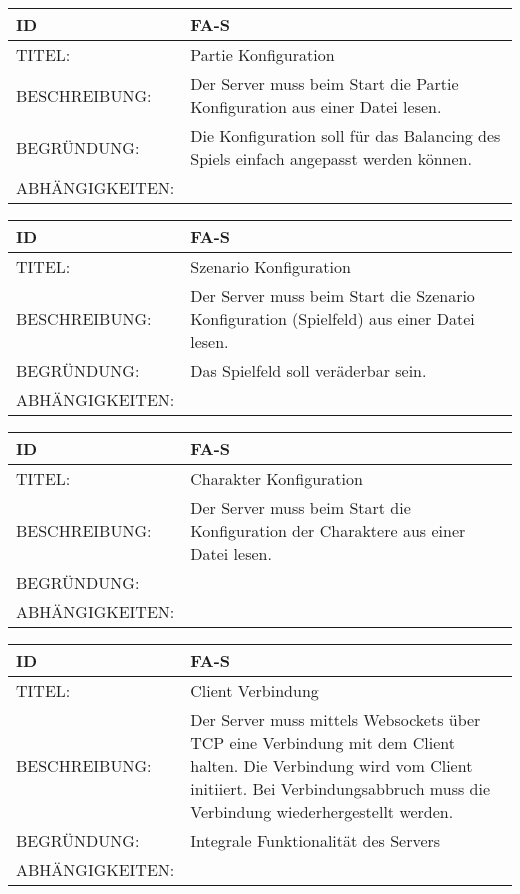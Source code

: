 \begin{tabularx}{16cm}{l|X}
\textbf{ID} & \textbf{FA-S} \\
\hline
TITEL: & Partie Konfiguration \\
\hline
BESCHREIBUNG: & Der Server muss beim Start die Partie Konfiguration aus einer Datei lesen. \\
\hline
BEGRÜNDUNG: & Die Konfiguration soll für das Balancing des Spiels einfach angepasst werden können. \\
\hline
ABHÄNGIGKEITEN: & \\
\end{tabularx}

\begin{tabularx}{16cm}{l|X}
\textbf{ID} & \textbf{FA-S} \\
\hline
TITEL: & Szenario Konfiguration \\
\hline
BESCHREIBUNG: & Der Server muss beim Start die Szenario Konfiguration (Spielfeld) aus einer Datei lesen. \\
\hline
BEGRÜNDUNG: & Das Spielfeld soll veräderbar sein. \\
\hline
ABHÄNGIGKEITEN: & \\
\end{tabularx}

\begin{tabularx}{16cm}{l|X}
\textbf{ID} & \textbf{FA-S} \\
\hline
TITEL: & Charakter Konfiguration \\
\hline
BESCHREIBUNG: & Der Server muss beim Start die Konfiguration der Charaktere aus einer Datei lesen. \\
\hline
BEGRÜNDUNG: & \\
\hline
ABHÄNGIGKEITEN: & \\
\end{tabularx}

\begin{tabularx}{16cm}{l|X}
\textbf{ID} & \textbf{FA-S} \\
\hline
TITEL: & Client Verbindung \\
\hline
BESCHREIBUNG: & Der Server muss mittels Websockets über TCP eine Verbindung mit dem Client halten.
Die Verbindung wird vom Client initiiert. Bei Verbindungsabbruch muss die Verbindung wiederhergestellt werden. \\
\hline
BEGRÜNDUNG: & Integrale Funktionalität des Servers \\
\hline
ABHÄNGIGKEITEN: & \\
\end{tabularx}


